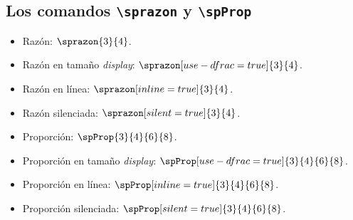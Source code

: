 \documentclass{article}
\begin{document}
\subsection*{Los comandos \texttt{\textbackslash sprazon} y \texttt{\textbackslash spProp}}

\begin{itemize}
  \item Razón: $\sprazon{3}{4}$.
  \item Razón en tamaño \emph{display}: $\sprazon[use-dfrac=true]{3}{4}$.
  \item Razón en línea: $\sprazon[inline=true]{3}{4}$.
  \item Razón silenciada: $\sprazon[silent=true]{3}{4}$.
  \item Proporción: $\spProp{3}{4}{6}{8}$.
  \item Proporción en tamaño \emph{display}: $\spProp[use-dfrac=true]{3}{4}{6}{8}$.
  \item Proporción en línea: $\spProp[inline=true]{3}{4}{6}{8}$.
  \item Proporción silenciada: $\spProp[silent=true]{3}{4}{6}{8}$.
\end{itemize}
\end{document}
